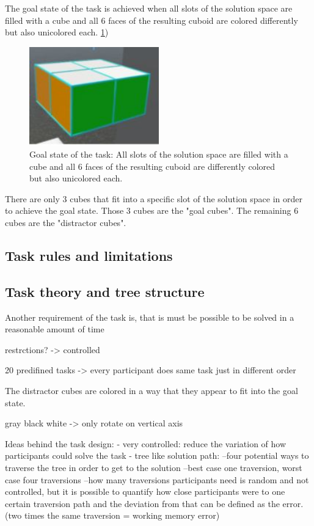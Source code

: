 \documentclass{article}
\begin{document}
The goal state of the task is achieved when all slots of the solution space are filled with a cube and all 6 faces of the resulting cuboid are colored differently but also unicolored each. \ref{fig:vr_task_goalstate})

\begin{figure}[h]
\centering
\includegraphics[width=0.5\textwidth]{vr_task_goalstate}
\caption{Goal state of the task: All slots of the solution space are filled with a cube and all 6 faces of the resulting cuboid are differently colored but also unicolored each. }
\label{fig:vr_task_goalstate}
\end{figure}

There are only 3 cubes that fit into a specific slot of the solution space in order to achieve the goal state. Those 3 cubes are the "goal cubes". The remaining 6 cubes are the "distractor cubes".

\subsection{Task rules and limitations}


\subsection{Task theory and tree structure}
Another requirement of the task is, that is must be possible to be solved in a reasonable amount of time 

restrctions? -> controlled

20 predifined tasks -> every participant does same task just in different order

The distractor cubes are colored in a way that they appear to fit into the goal state.

gray black white -> only rotate on vertical axis

Ideas behind the task design:	
- very controlled: reduce the variation of how participants could solve the task
- tree like solution path: 
--four potential ways to traverse the tree in order to get to the solution
--best case one traversion, worst case four traversions
--how many traversions participants need is random and not controlled, but it is possible to quantify how close participants were to one certain traversion path and the deviation from that can be defined as the error. (two times the same traversion = working memory error)
\end{document}
